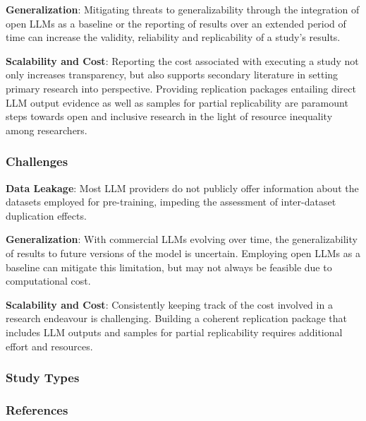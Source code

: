 \textbf{Generalization}:
Mitigating threats to generalizability through the integration of open LLMs as a baseline or the reporting of results over an extended period of time can increase the validity, reliability and replicability of a study's results.

\textbf{Scalability and Cost}:
Reporting the cost associated with executing a study not only increases transparency, but also supports secondary literature in setting primary research into perspective.
Providing replication packages entailing direct LLM output evidence as well as samples for partial replicability are paramount steps towards open and inclusive research in the light of resource inequality among researchers.



\subsubsection{Challenges}
\textbf{Data Leakage}:
Most LLM providers do not publicly offer information about the datasets employed for pre-training, impeding the assessment of inter-dataset duplication effects.

\textbf{Generalization}:
With commercial LLMs evolving over time, the generalizability of results to future versions of the model is uncertain. Employing open LLMs as a baseline can mitigate this limitation, but may not always be feasible due to computational cost.

\textbf{Scalability and Cost}:
Consistently keeping track of the cost involved in a research endeavour is challenging.
Building a coherent replication package that includes LLM outputs and samples for partial replicability requires additional effort and resources.


\subsubsection{Study Types}


\subsubsection{References}






